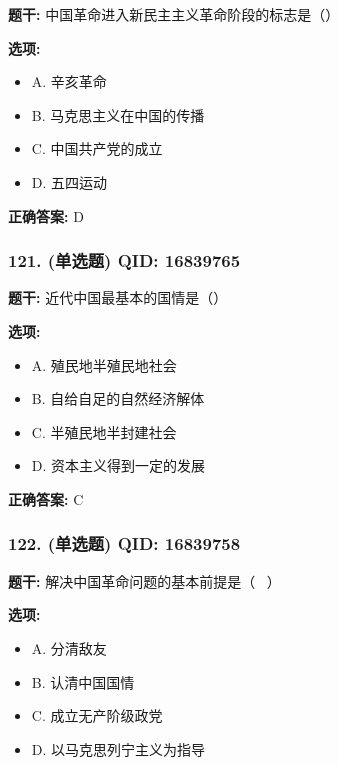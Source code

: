 \documentclass[12pt,UTF8]{ctexart}
\begin{document}
\textbf{题干:}
中国革命进入新民主主义革命阶段的标志是（）

\textbf{选项:}
\begin{itemize}[leftmargin=*]

  \item A. 辛亥革命

  \item B. 马克思主义在中国的传播

  \item C. 中国共产党的成立

  \item D. 五四运动

\end{itemize}

\textbf{正确答案:}
D

\vspace{0.3em}\hrulefill\vspace{0.7em}

\subsubsection*{121. (单选题) \small QID: 16839765}

\textbf{题干:}
近代中国最基本的国情是（）

\textbf{选项:}
\begin{itemize}[leftmargin=*]

  \item A. 殖民地半殖民地社会

  \item B. 自给自足的自然经济解体

  \item C. 半殖民地半封建社会

  \item D. 资本主义得到一定的发展

\end{itemize}

\textbf{正确答案:}
C

\vspace{0.3em}\hrulefill\vspace{0.7em}

\subsubsection*{122. (单选题) \small QID: 16839758}

\textbf{题干:}
解决中国革命问题的基本前提是（  ）

\textbf{选项:}
\begin{itemize}[leftmargin=*]

  \item A. 分清敌友

  \item B. 认清中国国情

  \item C. 成立无产阶级政党

  \item D. 以马克思列宁主义为指导

\end{itemize}
\end{document}
